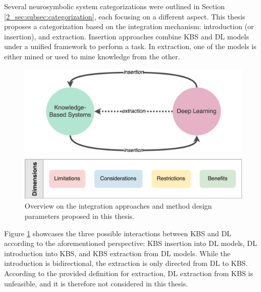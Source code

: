 Several neurosymbolic system categorizations were outlined in Section \ref{2_sec:subsec:categorization}, each focusing on a different aspect. This thesis proposes a categorization based on the integration mechanism: introduction (or insertion), and extraction. Insertion approaches combine KBS and DL models under a unified framework to perform a task. In extraction, one of the models is either mined or used to mine knowledge from the other. 

\begin{figure}[t]
    \centering
    \includegraphics[width=.9\linewidth]{3_objectives/figures/overview_method.eps}
    \caption{Overview on the integration approaches and method design parameters proposed in this thesis.}
    \label{fig:thesis_overview}
\end{figure}

Figure \ref{fig:thesis_overview} showcases the three possible interactions between KBS and DL according to the aforementioned perspective: KBS insertion into DL models, DL introduction into KBS, and KBS extraction from DL models. While the introduction is bidirectional, the extraction is only directed from DL to KBS. According to the provided definition for extraction, DL extraction from KBS is unfeasible, and it is therefore not considered in this thesis. 

